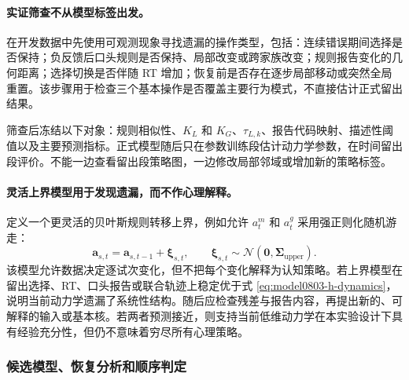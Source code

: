 \paragraph{实证筛查不从模型标签出发。}
在开发数据中先使用可观测现象寻找遗漏的操作类型，包括：连续错误期间选择是否保持；负反馈后口头规则是否保持、局部改变或跨家族改变；规则报告变化的几何距离；选择切换是否伴随 RT 增加；恢复前是否存在逐步局部移动或突然全局重置。该步骤用于检查三个基本操作是否覆盖主要行为模式，不直接估计正式留出结果。

筛查后冻结以下对象：规则相似性、$K_L$ 和 $K_G$、$\tau_{L,k}$、报告代码映射、描述性阈值以及主要预测指标。正式模型随后只在参数训练段估计动力学参数，在时间留出段评价。不能一边查看留出段策略图，一边修改局部邻域或增加新的策略标签。

\paragraph{灵活上界模型用于发现遗漏，而不作心理解释。}
定义一个更灵活的贝叶斯规则转移上界，例如允许 $a^m_t$ 和 $a^g_t$ 采用强正则化随机游走：
\begin{equation}
    \mathbf a_{s,t}
    =\mathbf a_{s,t-1}+\boldsymbol\xi_{s,t},
    \qquad
    \boldsymbol\xi_{s,t}
    \sim\mathcal N(\mathbf0,\boldsymbol\Sigma_{\mathrm{upper}}).
    \label{eq:model0803-upper-bound}
\end{equation}
该模型允许数据决定逐试次变化，但不把每个变化解释为认知策略。若上界模型在留出选择、RT、口头报告或联合轨迹上稳定优于式 \ref{eq:model0803-h-dynamics}，说明当前动力学遗漏了系统性结构。随后应检查残差与报告内容，再提出新的、可解释的输入或基本核。若两者预测接近，则支持当前低维动力学在本实验设计下具有经验充分性，但仍不意味着穷尽所有心理策略。


\subsubsection{候选模型、恢复分析和顺序判定}

